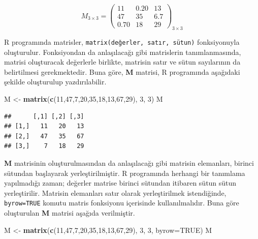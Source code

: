 \documentclass[
]{book}
\newenvironment{Shaded}{\begin{snugshade}}{\end{snugshade}}
\newcommand{\AttributeTok}[1]{\textcolor[rgb]{0.13,0.29,0.53}{#1}}
\newcommand{\ConstantTok}[1]{\textcolor[rgb]{0.56,0.35,0.01}{#1}}
\newcommand{\DecValTok}[1]{\textcolor[rgb]{0.00,0.00,0.81}{#1}}
\newcommand{\FunctionTok}[1]{\textcolor[rgb]{0.13,0.29,0.53}{\textbf{#1}}}
\newcommand{\NormalTok}[1]{#1}
\newcommand{\OtherTok}[1]{\textcolor[rgb]{0.56,0.35,0.01}{#1}}
\begin{document}
\[M_{3×3} =
  \begin{pmatrix}
11 & 0.20 & 13 \\
47 & 35 & 6.7 \\
0.70 & 18 & 29 
\end{pmatrix}_{3×3}\]

R programında matrisler, \texttt{matrix(değerler,\ satır,\ sütun)} fonksiyonuyla oluşturulur. Fonksiyondan da anlaşılacağı gibi matrislerin tanımlanmasında, matrisi oluşturacak değerlerle birlikte, matrisin satır ve sütun sayılarının da belirtilmesi gerekmektedir. Buna göre, \textbf{M} matrisi, R programında aşağıdaki şekilde oluşturulup yazdırılabilir.

\begin{Shaded}
\begin{Highlighting}[]
\NormalTok{M }\OtherTok{\textless{}{-}} \FunctionTok{matrix}\NormalTok{(}\FunctionTok{c}\NormalTok{(}\DecValTok{11}\NormalTok{,}\DecValTok{47}\NormalTok{,}\DecValTok{7}\NormalTok{,}\DecValTok{20}\NormalTok{,}\DecValTok{35}\NormalTok{,}\DecValTok{18}\NormalTok{,}\DecValTok{13}\NormalTok{,}\DecValTok{67}\NormalTok{,}\DecValTok{29}\NormalTok{), }\DecValTok{3}\NormalTok{, }\DecValTok{3}\NormalTok{) }
\NormalTok{M }
\end{Highlighting}
\end{Shaded}

\begin{verbatim}
##      [,1] [,2] [,3]
## [1,]   11   20   13
## [2,]   47   35   67
## [3,]    7   18   29
\end{verbatim}

\textbf{M} matrisinin oluşturulmasından da anlaşılacağı gibi matrisin elemanları, birinci sütundan başlayarak yerleştirilmiştir. R programında herhangi bir tanımlama yapılmadığı zaman; değerler matrise birinci sütundan itibaren sütun sütun yerleştirilir. Matrisin elemanları satır olarak yerleştirilmek istendiğinde, \texttt{byrow=TRUE} komutu matris fonksiyonu içerisinde kullanılmalıdır. Buna göre oluşturulan \textbf{M} matrisi aşağıda verilmiştir.

\begin{Shaded}
\begin{Highlighting}[]
\NormalTok{M }\OtherTok{\textless{}{-}} \FunctionTok{matrix}\NormalTok{(}\FunctionTok{c}\NormalTok{(}\DecValTok{11}\NormalTok{,}\DecValTok{47}\NormalTok{,}\DecValTok{7}\NormalTok{,}\DecValTok{20}\NormalTok{,}\DecValTok{35}\NormalTok{,}\DecValTok{18}\NormalTok{,}\DecValTok{13}\NormalTok{,}\DecValTok{67}\NormalTok{,}\DecValTok{29}\NormalTok{), }\DecValTok{3}\NormalTok{, }\DecValTok{3}\NormalTok{, }\AttributeTok{byrow=}\ConstantTok{TRUE}\NormalTok{) }
\NormalTok{M }
\end{Highlighting}
\end{Shaded}
\end{document}
